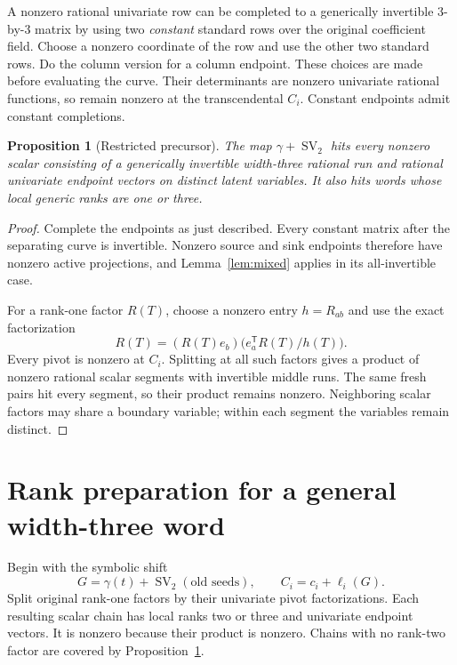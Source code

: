 \documentclass[11pt]{article}
\newtheorem{proposition}[theorem]{Proposition}
\newcommand{\SV}{\operatorname{SV}}
\begin{document}
A nonzero rational univariate row can be completed to a generically
invertible \(3\)-by-\(3\) matrix by using two \emph{constant} standard
rows over the original coefficient field. Choose a nonzero coordinate
of the row and use the other two standard rows. Do the column version
for a column endpoint. These choices are made before evaluating the
curve. Their determinants are nonzero univariate rational functions,
so remain nonzero at the transcendental \(C_i\). Constant endpoints
admit constant completions.

\begin{proposition}[Restricted precursor]\label{prop:precursor}
The map \(\gamma+\SV_2\) hits every nonzero scalar consisting of a
generically invertible width-three rational run and rational univariate
endpoint vectors on distinct latent variables. It also hits words whose
local generic ranks are one or three.
\end{proposition}

\begin{proof}
Complete the endpoints as just described. Every constant matrix after
the separating curve is invertible. Nonzero source and sink endpoints
therefore have nonzero active projections, and Lemma~\ref{lem:mixed}
applies in its all-invertible case.

For a rank-one factor \(R(T)\), choose a nonzero entry \(h=R_{ab}\)
and use the exact factorization
\[
 R(T)=(R(T)e_b)\bigl(e_a^{\mathsf T}R(T)/h(T)\bigr).
\]
Every pivot is nonzero at \(C_i\). Splitting at all such factors gives
a product of nonzero rational scalar segments with invertible middle
runs. The same fresh pairs hit every segment, so their product remains
nonzero. Neighboring scalar factors may share a boundary variable;
within each segment the variables remain distinct.
\end{proof}

\section{Rank preparation for a general width-three word}

Begin with the symbolic shift
\[
 G=\gamma(t)+\SV_2(\text{old seeds}),\qquad
 C_i=c_i+\ell_i(G).
\]
Split original rank-one factors by their univariate pivot
factorizations. Each resulting scalar chain has local ranks two or
three and univariate endpoint vectors. It is nonzero because their
product is nonzero. Chains with no rank-two factor are covered by
Proposition~\ref{prop:precursor}.
\end{document}
